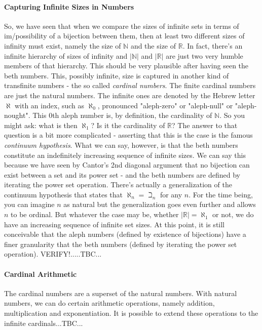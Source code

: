 \paragraph{Capturing Infinite Sizes in Numbers} So, we have seen that when we compare the sizes of infinite sets in terms of im/possibility of a bijection between them, then at least two different sizes of infinity must exist, namely the size of $\mathbb{N}$ and the size of $\mathbb{R}$. In fact, there's an infinite hierarchy of sizes of infinity and $|\mathbb{N}|$ and $|\mathbb{R}|$ are just two very humble members of that hierarchy. This should be very plausible after having seen the beth numbers. This, possibly infinite, size is captured in another kind of transfinite numbers - the so called \emph{cardinal numbers}. The finite cardinal numbers are just the natural numbers. The infinite ones are denoted by the Hebrew letter $\aleph$ with an index, such as $\aleph_0$, pronounced "aleph-zero" or "aleph-null" or "aleph-nought". This $0$th aleph number is, by definition, the cardinality of $\mathbb{N}$. So you might ask: what is then $\aleph_1$? Is it the cardinality of $\mathbb{R}$? The answer to that question is a bit more complicated - asserting that this is the case is the famous \emph{continuum hypothesis}. What we can say, however, is that the beth numbers constitute an indefinitely increasing sequence of infinite sizes. We can say this because we have seen by Cantor's 2nd diagonal argument that no bijection can exist between a set and its power set - and the beth numbers are defined by iterating the power set operation. There's actually a generalization of the continuum hypothesis that states that $\aleph_n = \beth_n$ for any $n$. For the time being, you can imagine $n$ as natural but the generalization goes even further and allows $n$ to be ordinal. But whatever the case may be, whether $|\mathbb{R}| = \aleph_1$ or not, we do have an increasing sequence of infinite set sizes. At this point, it is still conceivable that the aleph numbers (defined by existence of bijections) have a finer granularity that the beth numbers (defined by iterating the power set operation). VERIFY!.....TBC...


\paragraph{Cardinal Arithmetic}
The cardinal numbers are a superset of the natural numbers. With natural numbers, we can do certain arithmetic operations, namely addition, multiplication and exponentiation. It is possible to extend these operations to the infinite cardinals...TBC...


